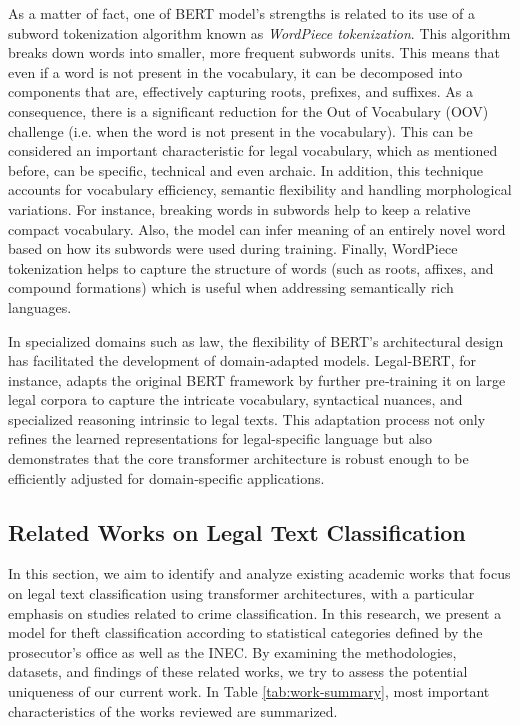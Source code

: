 \documentclass[onecolumn, journal, english, 12pt, a4paper]{IEEEtran} %
\theoremstyle{definition}
\begin{document}
As a matter of fact, one of BERT model's strengths is related to its
use of a subword tokenization algorithm known as \textit{WordPiece
  tokenization}. This algorithm breaks down words into smaller, more
frequent subwords units. This means that even if a word is not present
in the vocabulary, it can be decomposed into components that are,
effectively capturing roots, prefixes, and suffixes. As a consequence,
there is a significant reduction for the Out of Vocabulary (OOV)
challenge (i.e. when the word is not present in the vocabulary). This
can be considered an important characteristic for legal vocabulary,
which as mentioned before, can be specific, technical and even
archaic. In addition, this technique accounts for vocabulary
efficiency, semantic flexibility and handling morphological
variations. For instance, breaking words in subwords help to keep a
relative compact vocabulary. Also, the model can infer meaning of an
entirely novel word based on how its subwords were used during
training. Finally, WordPiece tokenization helps to capture the
structure of words (such as roots, affixes, and compound formations)
which is useful when addressing semantically rich languages.

In specialized domains such as law, the flexibility of BERT’s
architectural design has facilitated the development of domain‑adapted
models. Legal‑BERT, for instance, adapts the original BERT framework
by further pre‑training it on large legal corpora to capture the
intricate vocabulary, syntactical nuances, and specialized reasoning
intrinsic to legal texts\cite{chalkidis2020legal}. This adaptation
process not only refines the learned representations for
legal-specific language but also demonstrates that the core
transformer architecture is robust enough to be efficiently adjusted
for domain‑specific applications.

\subsection{Related Works on Legal Text Classification}
\label{sec:relat-works-mach}
In this section, we aim to identify and analyze existing academic
works that focus on legal text classification using transformer
architectures, with a particular emphasis on studies related to crime
classification. In this research, we present a model for theft
classification according to statistical categories defined by the
prosecutor's office as well as the INEC. By examining the
methodologies, datasets, and findings of these related works, we try
to assess the potential uniqueness of our current work. In Table
\ref{tab:work-summary}, most important characteristics of the works
reviewed are summarized.
\end{document}
